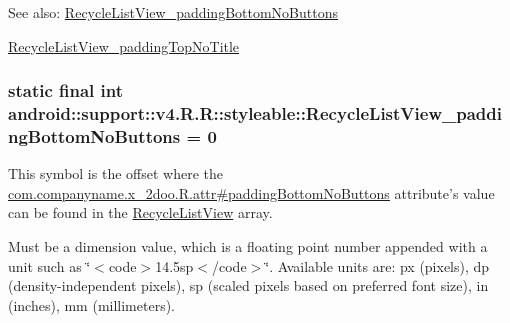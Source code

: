 \begin{Desc}
\item[See also:]\hyperlink{classandroid_1_1support_1_1v4_1_1_r_1_1styleable_c989ee173d297d6b648e6a7c3570d103}{RecycleListView\_\-paddingBottomNoButtons} 

\hyperlink{classandroid_1_1support_1_1v4_1_1_r_1_1styleable_f5dc6d14ce6c3162b12e614839fced9b}{RecycleListView\_\-paddingTopNoTitle} \end{Desc}
\hypertarget{classandroid_1_1support_1_1v4_1_1_r_1_1styleable_c989ee173d297d6b648e6a7c3570d103}{
\subsubsection[{RecycleListView\_\-paddingBottomNoButtons}]{\setlength{\rightskip}{0pt plus 5cm}static final int android::support::v4.R.R::styleable::RecycleListView\_\-paddingBottomNoButtons = 0}}
\label{classandroid_1_1support_1_1v4_1_1_r_1_1styleable_c989ee173d297d6b648e6a7c3570d103}


This symbol is the offset where the \hyperlink{classcom_1_1companyname_1_1x__2doo_1_1_r_1_1attr_c8c43a45f18ef218dbd075aea08fc41c}{com.companyname.x\_\-2doo.R.attr\#paddingBottomNoButtons} attribute's value can be found in the \hyperlink{classandroid_1_1support_1_1v4_1_1_r_1_1styleable_01daac6761518f23e42dc126a1955191}{RecycleListView} array.

Must be a dimension value, which is a floating point number appended with a unit such as \char`\"{}$<$code$>$14.5sp$<$/code$>$\char`\"{}. Available units are: px (pixels), dp (density-independent pixels), sp (scaled pixels based on preferred font size), in (inches), mm (millimeters). 


